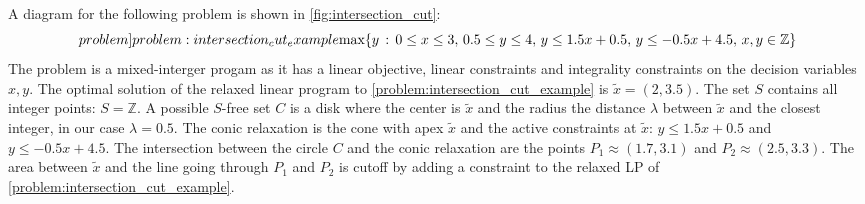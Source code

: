 A diagram for the following problem is shown in \cref{fig:intersection_cut}: 
\begin{equation} \label[problem]{problem:intersection_cut_example}
    \text{max} \{y \, : \, 0 \leq x \leq 3 , \, 0.5 \leq y \leq 4, \, y \leq 1.5 x + 0.5, \, y \leq -0.5 x + 4.5, \, x,y \in \mathbb{Z} \}
\end{equation}
The problem is a mixed-interger progam as it has a linear objective, linear constraints and integrality constraints on the decision variables $x,y$. The optimal solution of the relaxed linear program to \cref{problem:intersection_cut_example} is $\tilde x = (2,3.5)$. The set $S$ contains all integer points: $S = \mathbb{Z}$. A possible $S$-free set $C$ is a disk where the center is $\tilde x$ and the radius the distance $\lambda$ between $\tilde x$ and the closest integer, in our case $\lambda = 0.5$.  The conic relaxation is the cone with apex $\tilde x$ and the active constraints at $\tilde x$: $y \leq 1.5x + 0.5$ and $y \leq -0.5 x + 4.5$.  The intersection between the circle $C$ and the conic relaxation are the points $P_1 \approx (1.7,3.1)$ and $P_2 \approx (2.5,3.3)$. The area between $\tilde x$ and the line going through $P_1$ and $P_2$ is cutoff by adding a constraint to the relaxed LP of \cref{problem:intersection_cut_example}. 

